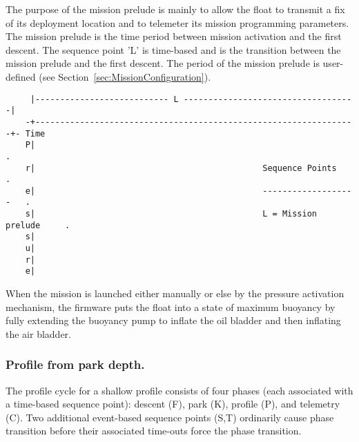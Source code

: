 The purpose of the mission prelude is mainly to allow the float to transmit
a fix of its deployment location and to telemeter its mission programming
parameters.  The mission prelude is the time period between mission
activation and the first descent.  The sequence point 'L' is time-based and
is the transition between the mission prelude and the first descent.  The
period of the mission prelude is user-defined (see
Section~\ref{sec:MissionConfiguration}).
   
\begin{minipage}{6in}
  \begin{verbatim}
     |--------------------------- L -----------------------------------|
    -+-----------------------------------------------------------------+- Time
    P|                                                                  .    
    r|                                              Sequence Points      .   
    e|                                              -------------------   .  
    s|                                              L = Mission prelude     .
    s|                                                                       
    u|
    r|
    e|
  \end{verbatim}
\end{minipage}

When the mission is launched either manually or else by the pressure
activation mechanism, the firmware puts the float into a state of maximum
buoyancy by fully extending the buoyancy pump to inflate the oil bladder and
then inflating the air bladder.

\subsubsection{Profile from park depth.}
\label{sec:ParkProfileCycle}

The profile cycle for a shallow profile consists of four phases (each
associated with a time-based sequence point): descent (F), park (K), profile
(P), and telemetry (C).  Two additional event-based sequence points (S,T)
ordinarily cause phase transition before their associated time-outs force
the phase transition.

